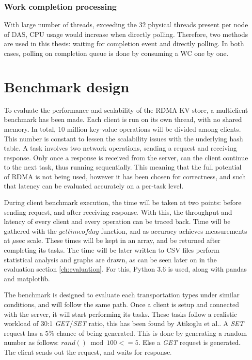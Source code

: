 
\subsubsection{Work completion processing}
With large number of threads, exceeding the 32 physical threads present per node of DAS, CPU usage would increase when directly polling.
Therefore, two methods are used in this thesis: waiting for completion event and directly polling.
In both cases, polling on completion queue is done by consuming a WC one by one.

\section{Benchmark design}\label{sec:benchmark-design}
To evaluate the performance and scalability of the RDMA KV store, a multiclient benchmark has been made.
Each client is run on its own thread, with no shared memory.
In total, 10 million key-value operations will be divided among clients.
This number is constant to lessen the scalability issues with the underlying hash table.
A task involves two network operations, sending a request and receiving response.
Only once a response is received from the server, can the client continue to the next task, thus running sequentially.
This meaning that the full potential of RDMA is not being used, however it has been chosen for correctness, and such that latency can be evaluated accurately on a per-task level. %

During client benchmark execution, the time will be taken at two points: before sending request, and after receiving response.
With this, the throughput and latency of every client and every operation can be traced back.
Time will be gathered with the $gettimeofday$ function, and as accuracy achieves measurements at $\mu$sec scale.
These times will be kept in an array, and be returned after completing its tasks.
The time will be later written to CSV files perform statistical analysis and graphs are drawn, as can be seen later on in the evaluation section \ref{ch:evaluation}.
For this, Python 3.6\cite{python} is used, along with pandas\cite{pandas} and matplotlib\cite{matplotlib}.

The benchmark is designed to evaluate each transportation types under similar conditions, and will follow the same path.
Once a client is setup and connected with the server, it will start performing its tasks.
These tasks follow a realistic workload of 30:1 \textit{GET}/\textit{SET} ratio, this has been found by Atikoglu et al.\cite{atikoglu2012workload}.
A \textit{SET} request has a 5\% chance of being generated.
This is done by generating a random number as follows: $rand() \bmod 100 <= 5$.
Else a \textit{GET} request is generated.
The client sends out the request, and waits for response.

